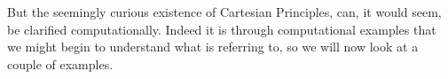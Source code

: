 \documentclass[a4paper, 12pt]{article}
\begin{document}
But the seemingly curious existence of Cartesian Principles, can, it would seem, be clarified computationally. Indeed it is through computational examples that we might begin to understand what  \citeauthor{descartes_principles_1982} is referring to, so we will now look at a couple of examples.













\end{document}
